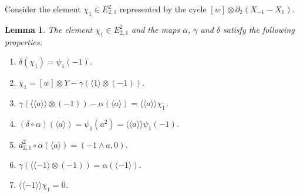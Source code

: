 \documentclass[11pt]{amsart}
\theoremstyle{definition}
\theoremstyle{plain}
\newtheorem{lem}[ntn]{Lemma}
\theoremstyle{definition}
\numberwithin{equation}{section}
\newcommand{\lan}{\langle}
\newcommand{\ran}{\rangle}
\newcommand{\Lan}{\langle \! \langle}
\newcommand{\Ran}{\rangle \! \rangle}
\begin{document}
	Consider the element $\chi_1\in E^2_{2,1}$ represented by the cycle $[w]\otimes\partial_2(X_{-1}-X_1)$.
	\begin{lem}\label{alpha-gam-chi}
		The element $\chi_1\in E^2_{2,1}$ and the maps $\alpha$, $\gamma$ and $\delta$ satisfy the following properties:
		\begin{enumerate}
			\item $\delta(\chi_1)=\psi_1(-1)$.
			\item $\chi_1=[w]\otimes Y-\gamma(\lan 1\ran\otimes (-1))$.
			\item $\gamma(\Lan a\Ran\otimes (-1))-\alpha(\lan a\ran)=\Lan a\Ran\chi_1$.
			\item $(\delta\circ\alpha)(\lan a\ran)=\psi_1(a^2)=\Lan a\Ran\psi_1(-1)$.
			\item $d^2_{2,1}\circ\alpha(\lan a\ran)=(-1\wedge a,0)$.
			\item $\gamma(\Lan -1\ran\otimes(-1))=\alpha(\lan -1\ran)$.
			\item $\Lan -1\Ran\chi_1=0$.
		\end{enumerate} 
	\end{lem}
\end{document}
